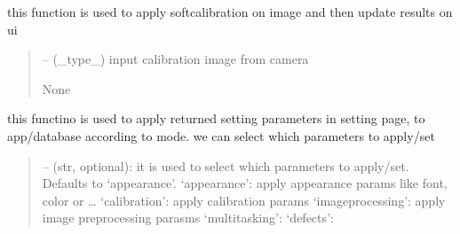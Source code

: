 \documentclass[letterpaper,10pt,english]{sphinxmanual}
\begin{document}
\begin{savenotes}
\begin{fulllineitems}
\begin{savenotes}
\begin{fulllineitems}
\begin{quote}
\begin{description}
\end{description}\end{quote}

\end{fulllineitems}\end{savenotes}


\begin{savenotes}\begin{fulllineitems}
\label{\detokenize{setting/setting_api:oxin.setting_api.API.apply_calibration_on_image}}
\pysigstartsignatures
{}
\pysigstopsignatures
\sphinxAtStartPar
this function is used to apply soft\sphinxhyphen{}calibration on image and then update results on ui
\begin{quote}\begin{description}
\sphinxAtStartPar
{} – (\_type\_) input calibration image from camera

\sphinxAtStartPar
None

\end{description}\end{quote}

\end{fulllineitems}\end{savenotes}


\begin{savenotes}\begin{fulllineitems}
\label{\detokenize{setting/setting_api:oxin.setting_api.API.apply_changed_appearance_params}}
\pysigstartsignatures
{}
\pysigstopsignatures
\sphinxAtStartPar
this functino is used to apply returned setting parameters in setting page, to app/database
according to mode. we can select which parameters to apply/set
\begin{quote}\begin{description}
\sphinxAtStartPar
{} – (str, optional): it is used to select which parameters to apply/set. Defaults to ‘appearance’.
‘appearance’: apply appearance params like font, color or …
‘calibration’: apply calibration params
‘imageprocessing’: apply image preprocessing parasms
‘multitasking’:
‘defects’:


\end{description}
\end{quote}
\end{fulllineitems}
\end{savenotes}
\end{fulllineitems}
\end{savenotes}
\end{document}

